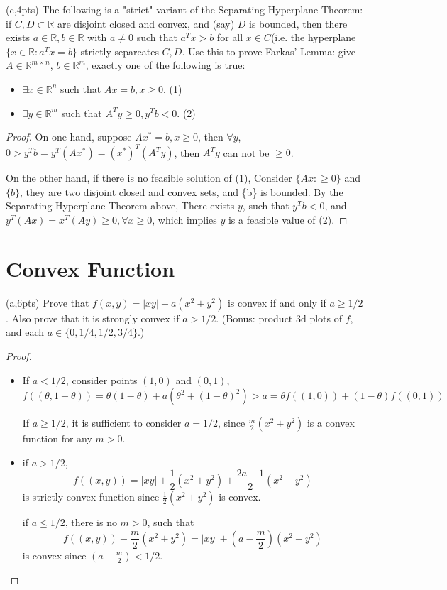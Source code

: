 \documentclass{article}     %
\begin{document}
(c,4pts) The following is a "strict" variant of the Separating Hyperplane Theorem: if $C,D\subset \mathbb{R}$ are disjoint closed and convex, and (say) $D$ is bounded, then there exists $a\in  \mathbb{R}, b\in  \mathbb{R}$ with $a\neq 0$ such that $a^Tx>b$ for all $x\in C$(i.e. the hyperplane$\{x\in  \mathbb{R}:a^Tx=b\}$ strictly separeates $C,D$. Use this to prove Farkas' Lemma: give $A\in  \mathbb{R}^{m\times n}$, $b\in \mathbb{R}^m$, exactly one of the following is true:

\begin{itemize}
    \item $\exists x\in  \mathbb{R}^{n}$ such that $Ax=b,x\geq 0$.   (1)
    \item $\exists y \in  \mathbb{R}^m$ such that $A^Ty\geq 0, y^Tb<0$.    (2)
\end{itemize}

\begin{proof}
On one hand, suppose $Ax^*=b, x\geq 0$, then $\forall y$, $0>y^Tb=y^T(Ax^*)=(x^*)^T(A^Ty)$, then $A^Ty$ can not be $\geq 0$.

On the other hand, if there is no feasible solution of (1), Consider $\{Ax:\geq 0\}$ and $\{b\}$, they are two disjoint closed and convex sets, and \{b\} is bounded. By the Separating Hyperplane Theorem above, There exists $y$, such that $y^Tb<0$, and $y^T(Ax)=x^T(Ay)\geq 0, \forall x\geq 0$, which implies $y$ is a feasible value of (2).


\end{proof}


\section{Convex Function}

(a,6pts) Prove that $f(x,y)=|xy|+a(x^2+y^2)$ is convex if and only if $a\geq 1/2$. Also prove that it is strongly convex if $a>1/2$. (Bonus: product 3d plots of $f$, and each $a\in \{0,1/4,1/2,3/4\}$.)

\begin{proof}
\begin{itemize}
    
    \item 
If $a<1/2$, consider points $(1,0)$ and $(0,1)$, 
\[f((\theta,1-\theta))=\theta (1-\theta)+a(\theta^2+(1-\theta)^2)>a=\theta f((1,0))+(1-\theta)f((0,1))\]

If $a\geq 1/2$, it is sufficient to consider $a=1/2$, since $\frac{m}{2}(x^2+y^2)$ is a convex function for any $m>0$.
\item 
if $a>1/2$, 
 $$f((x,y))=|xy|+\frac{1}{2}(x^2+y^2)+\frac{2a-1}{2}(x^2+y^2)$$ 
is strictly convex function since $\frac{1}{2}(x^2+y^2)$ is convex.

if $a\leq 1/2$, there is no $m>0$, such that 
 $$f((x,y))-\frac{m}{2}(x^2+y^2)=|xy|+(a-\frac{m}{2})(x^2+y^2)$$ 
is convex since $(a-\frac{m}{2})<1/2$.

\end{itemize}
\end{proof}
\end{document}
